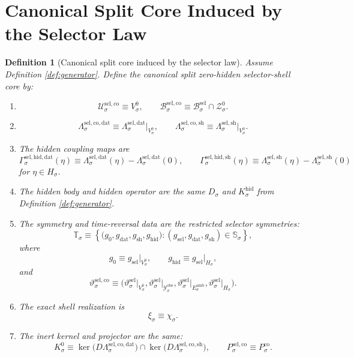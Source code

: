 \documentclass[11pt]{article}
\newcommand{\DataSpace}[1]{\mathcal Y_{#1}^{\mathrm{obs}}}
\newcommand{\AmbientTarget}[1]{E_{#1}^{\mathrm{amb}}}
\newcommand{\GenBody}[1]{\mathcal B_{#1}^{\mathrm{sel}}}
\newcommand{\GenData}[1]{\Lambda_{#1}^{\mathrm{sel,dat}}}
\newcommand{\GenShell}[1]{\Lambda_{#1}^{\mathrm{sel,sh}}}
\newcommand{\ZeroHiddenSlice}[1]{\mathcal Z_{#1}^{0}}
\newcommand{\ZeroHiddenVec}[1]{V_{#1}^{0}}
\newcommand{\GapSpace}[1]{H_{#1}}
\newcommand{\GapBody}[1]{D_{#1}}
\newcommand{\HiddenOperator}[1]{K_{#1}^{\mathrm{hid}}}
\newcommand{\GenSym}[1]{\mathbb S_{#1}}
\newcommand{\GenTime}[1]{\vartheta_{#1}^{\mathrm{sel}}}
\newcommand{\GenEmbed}[1]{\chi_{#1}}
\newcommand{\Kernel}[1]{K_{#1}^{0}}
\newcommand{\StateComp}[1]{P_{#1}^{\mathrm{co}}}
\newcommand{\SelCoreSpace}[1]{\mathcal U_{#1}^{\mathrm{sel,co}}}
\newcommand{\SelCoreBody}[1]{\mathcal B_{#1}^{\mathrm{sel,co}}}
\newcommand{\SelCoreData}[1]{\Lambda_{#1}^{\mathrm{sel,co,dat}}}
\newcommand{\SelCoreShell}[1]{\Lambda_{#1}^{\mathrm{sel,co,sh}}}
\newcommand{\SelHiddenData}[1]{\Gamma_{#1}^{\mathrm{sel,hid,dat}}}
\newcommand{\SelHiddenShell}[1]{\Gamma_{#1}^{\mathrm{sel,hid,sh}}}
\newcommand{\SelCoreSym}[1]{\mathbb T_{#1}}
\newcommand{\SelCoreTime}[1]{\vartheta_{#1}^{\mathrm{sel,co}}}
\newcommand{\SelCoreEmbed}[1]{\xi_{#1}}
\newcommand{\SelCoreProj}[1]{P_{#1}^{\mathrm{sel,co}}}
\newtheorem{definition}{Definition}
\begin{document}
\section{Canonical Split Core Induced by the Selector Law}

\begin{definition}[Canonical split core induced by the selector law]
\label{def:canonical}
Assume Definition \ref{def:generator}. Define the canonical split zero-hidden selector-shell core by:
\begin{enumerate}
    \item
    \[
    \SelCoreSpace{\sigma}\equiv\ZeroHiddenVec{\sigma},
    \qquad
    \SelCoreBody{\sigma}\equiv
    \GenBody{\sigma}\cap\ZeroHiddenSlice{\sigma}.
    \]
    \item
    \[
    \SelCoreData{\sigma}
    \equiv
    \GenData{\sigma}\big|_{\ZeroHiddenVec{\sigma}},
    \qquad
    \SelCoreShell{\sigma}
    \equiv
    \GenShell{\sigma}\big|_{\ZeroHiddenVec{\sigma}}.
    \]
    \item The hidden coupling maps are
    \begin{equation}
    \SelHiddenData{\sigma}(\eta)
    \equiv
    \GenData{\sigma}(\eta)-\GenData{\sigma}(0),
    \qquad
    \SelHiddenShell{\sigma}(\eta)
    \equiv
    \GenShell{\sigma}(\eta)-\GenShell{\sigma}(0)
    \label{eq:hiddencouplings}
    \end{equation}
    for \(\eta\in\GapSpace{\sigma}\).
    \item The hidden body and hidden operator are the same \(\GapBody{\sigma}\) and \(\HiddenOperator{\sigma}\) from Definition \ref{def:generator}.
    \item The symmetry and time-reversal data are the restricted selector symmetries:
    \[
    \SelCoreSym{\sigma}
    \equiv
    \left\{
    \bigl(
    g_{0},g_{\mathrm{dat}},g_{\mathrm{sh}},g_{\mathrm{hid}}
    \bigr):
    (g_{\mathrm{sel}},g_{\mathrm{dat}},g_{\mathrm{sh}})
    \in\GenSym{\sigma}
    \right\},
    \]
    where
    \[
    g_{0}\equiv g_{\mathrm{sel}}\big|_{\ZeroHiddenVec{\sigma}},
    \qquad
    g_{\mathrm{hid}}\equiv g_{\mathrm{sel}}\big|_{\GapSpace{\sigma}},
    \]
    and
    \[
    \SelCoreTime{\sigma}
    \equiv
    \bigl(
    \GenTime{\sigma}\big|_{\ZeroHiddenVec{\sigma}},
    \GenTime{\sigma}\big|_{\DataSpace{\sigma}},
    \GenTime{\sigma}\big|_{\AmbientTarget{\sigma}},
    \GenTime{\sigma}\big|_{\GapSpace{\sigma}}
    \bigr).
    \]
    \item The exact shell realization is
    \[
    \SelCoreEmbed{\sigma}\equiv\GenEmbed{\sigma}.
    \]
    \item The inert kernel and projector are the same:
    \[
    \Kernel{\sigma}
    \equiv
    \ker\bigl(D\SelCoreData{\sigma}\bigr)
    \cap
    \ker\bigl(D\SelCoreShell{\sigma}\bigr),
    \qquad
    \SelCoreProj{\sigma}\equiv\StateComp{\sigma}.
    \]
\end{enumerate}
\end{definition}
\end{document}
